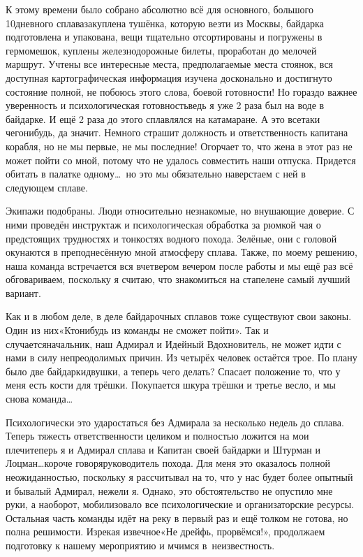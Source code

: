 К этому времени было собрано абсолютно всё для основного, большого 10\sdash дневного сплава\mdash закуплена тушёнка, которую везти из Москвы, байдарка подготовлена и упакована, вещи тщательно отсортированы и погружены в гермомешок, куплены железнодорожные билеты, проработан до мелочей маршрут. Учтены все интересные места, предполагаемые места стоянок, вся доступная картографическая информация изучена досконально и достигнуто состояние полной, не побоюсь этого слова, боевой готовности! Но гораздо  важнее уверенность и психологическая готовность\mdash ведь я уже 2 раза был на воде в байдарке. И ещё 2 раза до этого сплавлялся на катамаране. А это все\sdash таки чего\sdash нибудь, да значит. Немного страшит должность и ответственность капитана корабля, но не мы первые, не мы последние! Огорчает то, что жена в этот раз не может пойти со мной, потому что не удалось совместить наши отпуска. Придется обитать в палатке одному\ldots~но это мы обязательно наверстаем с ней в следующем сплаве. 

Экипажи подобраны. Люди относительно незнакомые, но внушающие доверие. С ними проведён инструктаж и психологическая обработка за рюмкой чая о предстоящих трудностях и тонкостях водного похода. Зелёные, они с головой окунаются в преподнесённую мной атмосферу сплава. Также, по моему решению, наша команда встречается вся вчетвером вечером после работы и мы ещё раз всё обговариваем, поскольку я считаю, что знакомиться на стапеле\mdash не самый лучший вариант.

Как и в любом деле, в деле байдарочных сплавов тоже существуют свои законы. Один из них\mdash «Кто\sdash нибудь из команды не сможет пойти». Так и случается\mdash начальник, наш Адмирал и Идейный Вдохновитель, не может идти с нами в силу непреодолимых причин. Из четырёх человек остаётся трое. По плану было две байдарки\sdash двушки, а теперь чего делать? Спасает положение то, что у меня есть кости для трёшки. Покупается шкура трёшки и третье весло, и мы снова команда\ldots
 
Психологически это удар\mdash остаться без Адмирала за несколько недель до сплава. Теперь тяжесть ответственности целиком и полностью ложится на мои плечи\mdash теперь я и Адмирал сплава и Капитан своей байдарки и Штурман и Лоцман\ldots короче говоря\mdash руководитель похода. Для меня это оказалось полной неожиданностью, поскольку я рассчитывал на то, что у нас будет более опытный и бывалый Адмирал, нежели я. Однако, это обстоятельство не опустило мне руки, а наоборот, мобилизовало все психологические и организаторские ресурсы. Остальная часть команды идёт на реку в первый раз и ещё толком не готова, но полна решимости. Изрекая извечное\mdash «Не дрейфь, прорвёмся!», продолжаем подготовку к нашему мероприятию и мчимся в~неизвестность. 

\begin{center}
\end{center}